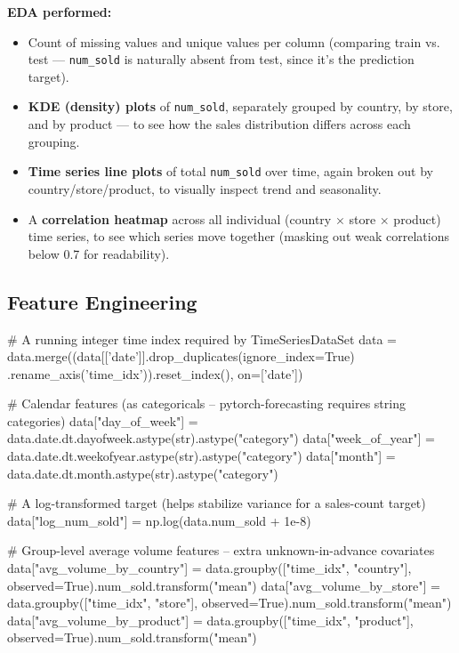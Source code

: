 \documentclass[12pt,openany]{book}
\theoremstyle{definition}
\theoremstyle{remark}
\begin{document}
\textbf{EDA performed:}
\begin{itemize}
\item Count of missing values and unique values per column (comparing train vs. test --- \texttt{num\_sold} is naturally absent from test, since it's the prediction target).
\item \textbf{KDE (density) plots} of \texttt{num\_sold}, separately grouped by country, by store, and by product --- to see how the sales distribution differs across each grouping.
\item \textbf{Time series line plots} of total \texttt{num\_sold} over time, again broken out by country/store/product, to visually inspect trend and seasonality.
\item A \textbf{correlation heatmap} across all individual (country \ensuremath{\times} store \ensuremath{\times} product) time series, to see which series move together (masking out weak correlations below 0.7 for readability).

\end{itemize}

\subsection{Feature Engineering}

\begin{python}
# A running integer time index required by TimeSeriesDataSet
data = data.merge((data[['date']].drop_duplicates(ignore_index=True)
                    .rename_axis('time_idx')).reset_index(), on=['date'])

# Calendar features (as categoricals -- pytorch-forecasting requires string categories)
data["day_of_week"] = data.date.dt.dayofweek.astype(str).astype("category")
data["week_of_year"] = data.date.dt.weekofyear.astype(str).astype("category")
data["month"] = data.date.dt.month.astype(str).astype("category")

# A log-transformed target (helps stabilize variance for a sales-count target)
data["log_num_sold"] = np.log(data.num_sold + 1e-8)

# Group-level average volume features -- extra unknown-in-advance covariates
data["avg_volume_by_country"] = data.groupby(["time_idx", "country"], observed=True).num_sold.transform("mean")
data["avg_volume_by_store"] = data.groupby(["time_idx", "store"], observed=True).num_sold.transform("mean")
data["avg_volume_by_product"] = data.groupby(["time_idx", "product"], observed=True).num_sold.transform("mean")
\end{python}
\end{document}
